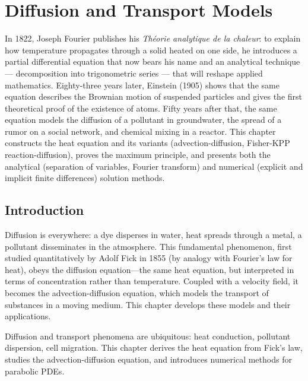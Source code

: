 \chapter{Diffusion and Transport Models}
\label{ch:diffusion}

In 1822, Joseph Fourier publishes his \emph{Théorie analytique de la chaleur}: to explain how temperature propagates through a solid heated on one side, he introduces a partial differential equation that now bears his name and an analytical technique --- decomposition into trigonometric series --- that will reshape applied mathematics. Eighty-three years later, Einstein (1905) shows that the same equation describes the Brownian motion of suspended particles and gives the first theoretical proof of the existence of atoms. Fifty years after that, the same equation models the diffusion of a pollutant in groundwater, the spread of a rumor on a social network, and chemical mixing in a reactor. This chapter constructs the heat equation and its variants (advection-diffusion, Fisher-KPP reaction-diffusion), proves the maximum principle, and presents both the analytical (separation of variables, Fourier transform) and numerical (explicit and implicit finite differences) solution methods.

\section{Introduction}

Diffusion is everywhere: a dye disperses in water, heat spreads through a metal, a pollutant disseminates in the atmosphere. This fundamental phenomenon, first studied quantitatively by Adolf Fick in 1855 (by analogy with Fourier's law for heat), obeys the diffusion equation---the same heat equation, but interpreted in terms of concentration rather than temperature. Coupled with a velocity field, it becomes the advection-diffusion equation, which models the transport of substances in a moving medium. This chapter develops these models and their applications.

Diffusion and transport phenomena are ubiquitous: heat conduction,
pollutant dispersion, cell migration.  This chapter derives the heat
equation from Fick's law, studies the advection-diffusion equation,
and introduces numerical methods for parabolic PDEs.

